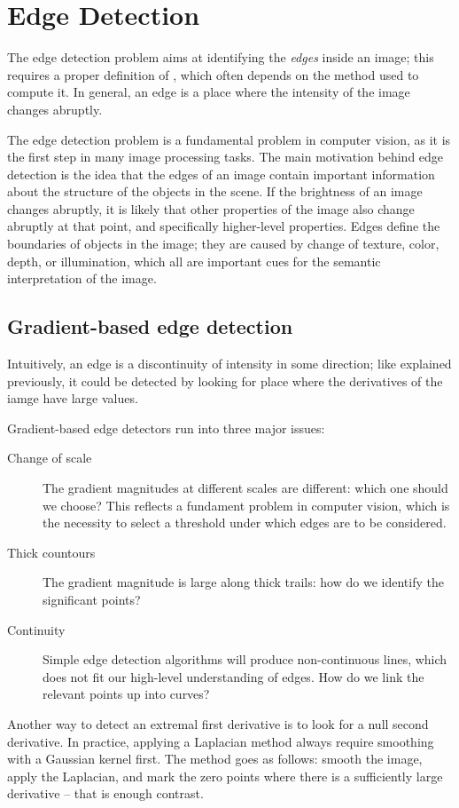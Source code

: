 \section{Edge Detection}
The edge detection problem aims at identifying the \emph{edges} inside an image; this requires a proper definition of , which often depends on the method used to compute it. In general, an edge is a place where the intensity of the image changes abruptly. 

The edge detection problem is a fundamental problem in computer vision, as it is the first step in many image processing tasks. The main motivation behind edge detection is the idea that the edges of an image contain important information about the structure of the objects in the scene. If the brightness of an image changes abruptly, it is likely that other properties of the image also change abruptly at that point, and specifically higher-level properties. Edges define the boundaries of objects in the image; they are caused by change of texture, color, depth, or illumination, which all are important cues for the semantic interpretation of the image.

\subsection{Gradient-based edge detection}
Intuitively, an edge is a discontinuity of intensity in some direction; like explained previously, it could be detected by looking for place where the derivatives of the iamge have large values.

Gradient-based edge detectors run into three major issues:
\begin{description}
    \item[Change of scale] The gradient magnitudes at different scales are different: which one should we choose? This reflects a fundament problem in computer vision, which is the necessity to select a threshold under which edges are  to be considered.
    \item[Thick countours] The gradient magnitude is large along thick trails: how do we identify the significant points?
    \item[Continuity] Simple edge detection algorithms will produce non-continuous lines, which does not fit our high-level understanding of edges. How do we link the relevant points up into curves?
\end{description}

Another way to detect an extremal first derivative is to look for a null second derivative. In practice, applying a Laplacian method always require smoothing with a Gaussian kernel first. The method goes as follows: smooth the image, apply the Laplacian, and mark the zero points where there is a sufficiently large derivative -- that is enough contrast.

